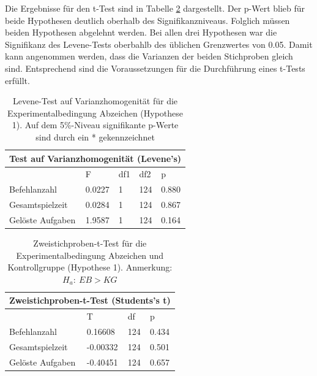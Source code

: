 Die Ergebnisse für den t-Test sind in Tabelle \ref{ttest_hypo_1} dargestellt. Der p-Wert blieb für beide Hypothesen deutlich oberhalb des Signifikanzniveaus. Folglich müssen beiden Hypothesen abgelehnt werden. Bei allen drei Hypothesen war die Signifikanz des Levene-Tests oberbahlb des üblichen Grenzwertes von 0.05. Damit kann angenommen werden, dass die Varianzen der beiden Stichproben gleich sind. Entsprechend sind die Voraussetzungen für die Durchführung eines t-Tests erfüllt.

\begin{table}[htbp]
\centering
\begin{tabular}{ |p{4cm}||p{2.0cm}|p{2.0cm}|p{2.0cm}|p{2.0cm}| }
 \hline
 \multicolumn{5}{|c|}{Test auf Varianzhomogenität (Levene's)} \\
 \hline
 & F & df1 &df2 &p \\
 \hline
  Befehlanzahl      & 0.0227    & 1 &   124 & 0.880\\
  Gesamtspielzeit   & 0.0284    & 1 &   124 & 0.867\\
  Gelöste Aufgaben  & 1.9587    & 1 &   124 & 0.164\\
 \hline
\end{tabular}
\caption{Levene-Test auf Varianzhomogenität für die Experimentalbedingung Abzeichen (Hypothese 1). Auf dem 5\%-Niveau signifikante p-Werte sind durch ein * gekennzeichnet}
\label{levene_hypo_1}
\end{table}
\begin{table}[htbp]
\centering
\begin{tabular}{ |p{4cm}||p{2.0cm}|p{2.0cm}|p{2.0cm}| }
 \hline
 \multicolumn{4}{|c|}{Zweistichproben-t-Test (Students's t)} \\
 \hline
 & T &df & p \\
 \hline
  Befehlanzahl       & 0.16608  &   124 & 0.434\\
  Gesamtspielzeit    & -0.00332 &   124 & 0.501\\
  Gelöste Aufgaben   & -0.40451 &   124 & 0.657\\
 \hline
\end{tabular}
\caption{Zweistichproben-t-Test für die Experimentalbedingung Abzeichen und Kontrollgruppe (Hypothese 1). Anmerkung: $H_a:\: EB > KG$}
\label{ttest_hypo_1}
\end{table}



